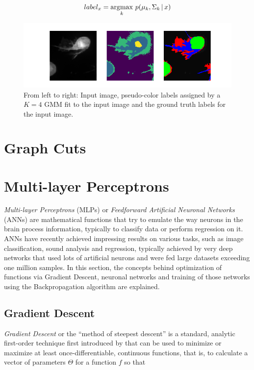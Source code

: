 \[ label_x = \operatorname*{\arg\!\max} \limits_{k} \, p(\mu_k, \Sigma_k\, | \, x) \]

\begin {figure}[!ht]
	\includegraphics{img/fig_gmm_vs_gt}
	\caption{From left to right: Input image, pseudo-color labels assigned by a $K=4$ GMM fit to the input image and the ground truth labels for the input image.}
	\label{fig:gmm_vs_gt}
\end {figure}


	\section{Graph Cuts}



	\section{Multi-layer Perceptrons}
\textit{Multi-layer Perceptrons} (MLPs) or \textit{Feedforward Artificial Neuronal Networks} (ANNs) are mathematical functions that try to emulate the way neurons in the brain process information, typically to classify data or perform regression on it. ANNs have recently achieved impressing results on various tasks, such as image classification, sound analysis and regression, typically achieved by very deep networks that used lots of artificial neurons and were fed large datasets exceeding one million samples. In this section, the concepts behind optimization of functions via Gradient Descent, neuronal networks and training of those networks using the Backpropagation algorithm are explained. 



\subsection {Gradient Descent}
\label{subsec:grad_desc}

\textit{Gradient Descent} or the ``method of steepest descent'' is a standard, analytic first-order technique first introduced by that can be used to minimize or maximize at least once-differentiable, continuous functions, that is, to calculate a vector of parameters $\Theta$ for a function $f$ so that

